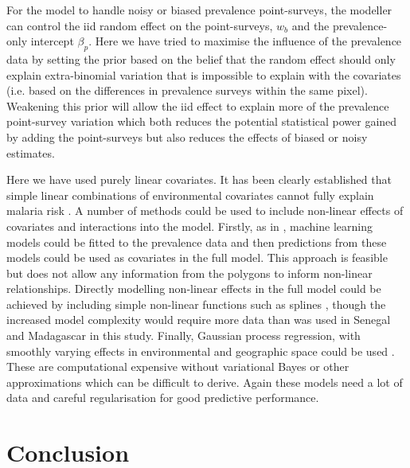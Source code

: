 \documentclass{statsoc}
\begin{document}
For the model to handle noisy or biased prevalence point-surveys, the modeller can control the iid random effect on the point-surveys, $w_b$ and the prevalence-only intercept $\beta_p$. 
Here we have tried to maximise the influence of the prevalence data by setting the prior based on the belief that the random effect should only explain extra-binomial variation that is impossible to explain with the covariates (i.e. based on the differences in prevalence surveys within the same pixel).
Weakening this prior will allow the iid effect to explain more of the prevalence point-survey variation which both reduces the potential statistical power gained by adding the point-surveys but also reduces the effects of biased or noisy estimates.


Here we have used purely linear covariates.
It has been clearly established that simple linear combinations of environmental covariates cannot fully explain malaria risk \citep{bhatt2017improved}.
A number of methods could be used to include non-linear effects of covariates and interactions into the model.
Firstly, as in \citep{bhatt2017improved}, machine learning models could be fitted to the prevalence data and then predictions from these models could be used as covariates in the full model.
This approach is feasible but does not allow any information from the polygons to inform non-linear relationships.
Directly modelling non-linear effects in the full model could be achieved by including simple non-linear functions such as splines \citep{sissoko2017temporal, sewe2017using, hundessa2018projecting}, though the increased model complexity would require more data than was used in Senegal and Madagascar in this study.
Finally, Gaussian process regression, with smoothly varying effects in environmental and geographic space could be used \citep{law2018variational}.
These are computational expensive without variational Bayes or other approximations \citep{law2018variational, ton2018spatial} which can be difficult to derive.
Again these models need a lot of data and careful regularisation for good predictive performance.





\section*{Conclusion}
\end{document}
